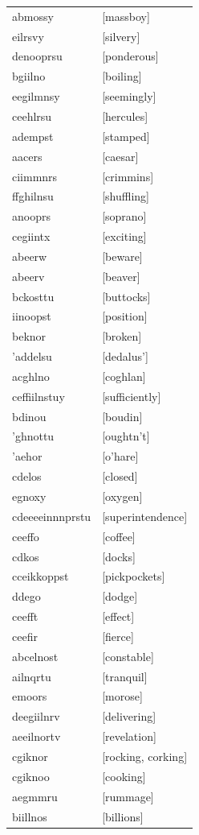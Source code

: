 \documentclass{article}
\begin{document}
\begin{tabular}{ll}
abmossy & [massboy] \\
eilrsvy & [silvery] \\
denooprsu & [ponderous] \\
bgiilno & [boiling] \\
eegilmnsy & [seemingly] \\
ceehlrsu & [hercules] \\
adempst & [stamped] \\
aacers & [caesar] \\
ciimmnrs & [crimmins] \\
ffghilnsu & [shuffling] \\
anooprs & [soprano] \\
cegiintx & [exciting] \\
abeerw & [beware] \\
abeerv & [beaver] \\
bckosttu & [buttocks] \\
iinoopst & [position] \\
beknor & [broken] \\
'addelsu & [dedalus'] \\
acghlno & [coghlan] \\
ceffiilnstuy & [sufficiently] \\
bdinou & [boudin] \\
'ghnottu & [oughtn't] \\
'aehor & [o'hare] \\
cdelos & [closed] \\
egnoxy & [oxygen] \\
cdeeeeinnnprstu & [superintendence] \\
ceeffo & [coffee] \\
cdkos & [docks] \\
cceikkoppst & [pickpockets] \\
ddego & [dodge] \\
ceefft & [effect] \\
ceefir & [fierce] \\
abcelnost & [constable] \\
ailnqrtu & [tranquil] \\
emoors & [morose] \\
deegiilnrv & [delivering] \\
aeeilnortv & [revelation] \\
cgiknor & [rocking, corking] \\
cgiknoo & [cooking] \\
aegmmru & [rummage] \\
biillnos & [billions] \\

\end{tabular}
\end{document}
